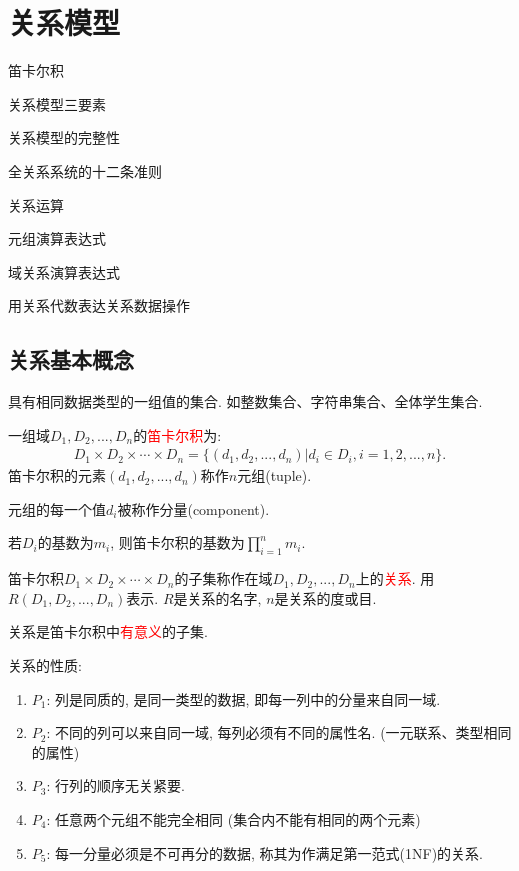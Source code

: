 \chapter{关系模型}

\begin{introduction}[期末考试提纲]
    \item 笛卡尔积
    \item 关系模型三要素
    \item 关系模型的完整性
    \item 全关系系统的十二条准则
    \item 关系运算
    \item 元组演算表达式
    \item 域关系演算表达式
    \item 用关系代数表达关系数据操作
\end{introduction}

\section{关系基本概念}

\begin{definition}[域(Domain)]
具有相同数据类型的一组值的集合.
如整数集合、字符串集合、全体学生集合.
\end{definition}

\begin{definition}
一组域$D_1,D_2,...,D_n$的\textcolor{red}{笛卡尔积}为:
\begin{align*}
    D_1\times D_2\times \cdots\times D_n = \{(d_1,d_2,...,d_n)|d_i\in D_i, i=1,2,...,n\}.
\end{align*}
笛卡尔积的元素$(d_1,d_2,...,d_n)$称作$n$元组(tuple).

元组的每一个值$d_i$被称作分量(component).

若$D_i$的基数为$m_i$, 则笛卡尔积的基数为$\prod_{i=1}^{n}m_i$.
\end{definition}

\begin{definition}[关系]
笛卡尔积$D_1\times D_2\times \cdots\times D_n$的子集称作在域$D_1,D_2,...,D_n$上的\textcolor{red}{关系}. 用$R(D_1,D_2,...,D_n)$表示. $R$是关系的名字, $n$是关系的度或目.

关系是笛卡尔积中\textcolor{red}{有意义}的子集.
\end{definition}

关系的性质:
\begin{enumerate}
    \item $P_1$: 列是同质的, 是同一类型的数据, 即每一列中的分量来自同一域.
    \item $P_2$: 不同的列可以来自同一域, 每列必须有不同的属性名. (一元联系、类型相同的属性)
    \item $P_3$: 行列的顺序无关紧要.
    \item $P_4$: 任意两个元组不能完全相同 (集合内不能有相同的两个元素)
    \item $P_5$: 每一分量必须是不可再分的数据, 称其为作满足第一范式(1NF)的关系. 
\end{enumerate}

